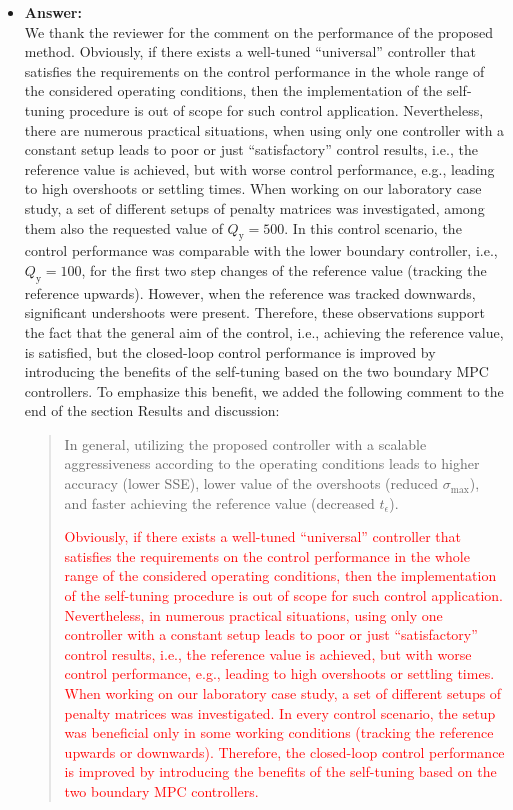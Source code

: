 \documentclass[a4paper,10pt]{article}
\newcommand{\change}[1]{\textcolor{red}{#1}}
\newcommand{\answer}[1]{
	\begin{itemize}
		\item[] \textbf{Answer:}\\ #1
	\end{itemize}
}
\begin{document}
	\answer{		
		We thank the reviewer for the comment on the performance of the proposed method. Obviously, if there exists a well-tuned ``universal'' controller that satisfies the requirements on the control performance in the whole range of the considered operating conditions, then the implementation of the self-tuning procedure is out of scope for such control application. Nevertheless, there are numerous practical situations, when using only one controller with a constant setup leads to poor or just ``satisfactory'' control results, i.e., the reference value is achieved, but with worse control performance, e.g., leading to high overshoots or settling times. When working on our laboratory case study, a set of different setups of penalty matrices was investigated, among them also the requested value of $Q_\mathrm{y} = 500$. In this control scenario, the control performance was comparable with the lower boundary controller, i.e., $Q_\mathrm{y} = 100$, for the first two step changes of the reference value (tracking the reference upwards). However, when the reference was tracked downwards, significant undershoots were present. Therefore, these observations support the fact that the general aim of the control, i.e., achieving the reference value, is satisfied, but the closed-loop control performance is improved by introducing the benefits of the self-tuning based on the two boundary MPC controllers. To emphasize this benefit, we added the following comment to the end of the section Results and discussion: 
		\begin{quote}			
			In general, utilizing the proposed controller with a scalable aggressiveness according to the operating conditions leads to higher accuracy (lower SSE), lower value of the overshoots (reduced $\sigma_{\mathrm{max}}$), and faster achieving the reference value (decreased $t_{\epsilon}$).
			
			\change{Obviously, if there exists a well-tuned ``universal'' controller that satisfies the requirements on the control performance in the whole range of the considered operating conditions, then the implementation of the self-tuning procedure is out of scope for such control application. Nevertheless, in numerous practical situations, using only one controller with a constant setup leads to poor or just ``satisfactory'' control results, i.e., the reference value is achieved, but with worse control performance, e.g., leading to high overshoots or settling times. When working on our laboratory case study, a set of different setups of penalty matrices was investigated. In every control scenario, the setup was beneficial only in some working conditions (tracking the reference upwards or downwards). Therefore, the closed-loop control performance is improved by introducing the benefits of the self-tuning based on the two boundary MPC controllers.}
		\end{quote}		
	}
\end{document}
